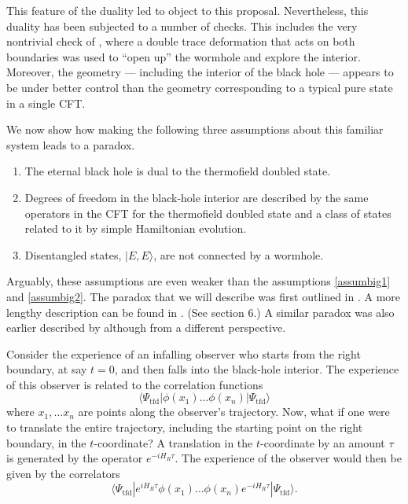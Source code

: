 \documentclass[12pt]{article}
\newcommand{\tfd}{\Psi_{\text{tfd}}} %
\begin{document}
This feature of the duality led \cite{Avery:2013bea,Mathur:2014dia} to object to this proposal.  Nevertheless, this  duality has been subjected to a number of checks. This includes the very nontrivial check of \cite{Gao:2016bin},  where a double trace deformation that acts on both boundaries was used to ``open up'' the wormhole and explore the interior. Moreover,  the geometry --- including the interior of the black hole --- appears to be under better control than the geometry corresponding to a typical pure state in a single CFT. 


We now show how making the following three assumptions about this familiar system leads to a paradox. 
\begin{enumerate}
\item\label{eternalassumbig1}
The eternal black hole is dual to the thermofield doubled state.
\item\label{eternalassumbig2}
Degrees of freedom in the black-hole interior are described by the same
operators in the CFT for the thermofield doubled state and a class of states related to it by simple Hamiltonian evolution.
\item\label{eternalassumbig3}
Disentangled states, $|E,E \rangle$, are not connected by a wormhole.
\end{enumerate}
Arguably, these assumptions are even weaker than the assumptions \ref{assumbig1} and \ref{assumbig2}. The paradox that we will describe was first outlined in \cite{Papadodimas:2015xma}. A more lengthy description can be found in \cite{Papadodimas:2015jra}. (See section 6.) A similar paradox was also earlier described by \cite{Marolf:2012xe} although from a different perspective. 


Consider the experience of an infalling observer who starts from the right boundary, at say $t = 0$,  and then falls into the black-hole interior. The experience of this observer
is related to the correlation functions
\[
\langle \tfd | \phi(x_1) \ldots \phi(x_n) |\tfd \rangle
\]
where $x_1, \ldots x_n$ are points along the observer's trajectory. Now, what if one were to translate the entire trajectory, including the starting point on the right boundary, in the $t$-coordinate? A translation in the $t$-coordinate
by an amount $\tau$ is generated by the operator $e^{-i H_R \tau}$. The experience of the observer would then be given by the correlators
\[
\langle \tfd | e^{i H_R \tau} \phi(x_1) \ldots \phi(x_n) e^{-i H_R \tau} |\tfd \rangle.
\]
\end{document}
